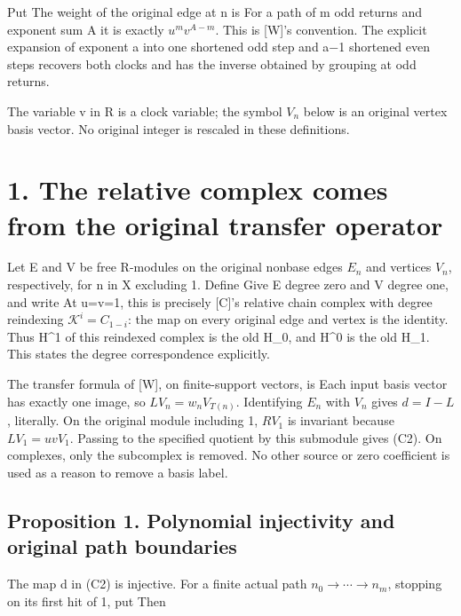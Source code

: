 Put  The weight of the
original edge at n is  For a path of m
odd returns and exponent sum A it is exactly \(u^m v^{A-m}\). This is
{[}W{]}'s convention. The explicit expansion of exponent a into one
shortened odd step and a−1 shortened even steps recovers both clocks and
has the inverse obtained by grouping at odd returns.

The variable v in R is a clock variable; the symbol \(V_n\) below is an
original vertex basis vector. No original integer is rescaled in these
definitions.

\section{1. The relative complex comes from the original transfer
operator}

Let E and V be free R-modules on the original nonbase edges \(E_n\) and
vertices \(V_n\), respectively, for n in X excluding 1. Define
 Give E degree
zero and V degree one, and write
 At
u=v=1, this is precisely {[}C{]}'s relative chain complex with degree
reindexing \(\mathcal K^i=C_{1-i}\): the map on every original edge and
vertex is the identity. Thus H\^{}1 of this reindexed complex is the old
H\_0, and H\^{}0 is the old H\_1. This states the degree correspondence
explicitly.

The transfer formula of {[}W{]}, on finite-support vectors, is
 Each input basis
vector has exactly one image, so \(L V_n=w_nV_{T(n)}\). Identifying
\(E_n\) with \(V_n\) gives \(d=I-L\), literally. On the original module
including 1, \(R V_1\) is invariant because \(L V_1=uvV_1\). Passing to
the specified quotient by this submodule gives (C2). On complexes, only
the subcomplex \SourceMath{[R E_1\xrightarrow{1-uv}R V_1]}{} is removed.
No other source or zero coefficient is used as a reason to remove a
basis label.

\subsection{Proposition 1. Polynomial injectivity and original path
boundaries}

The map d in (C2) is injective. For a finite actual path
\(n_0\to\cdots\to n_m\), stopping on its first hit of 1, put
 Then

